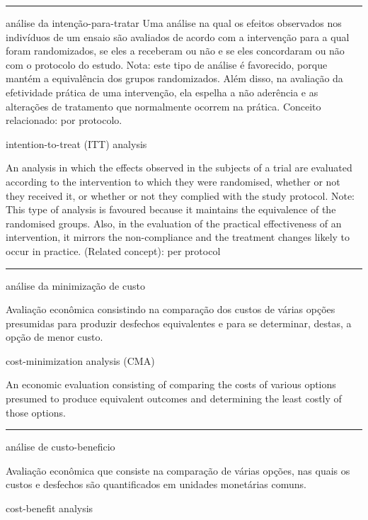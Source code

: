 \documentclass[
  openany]{book}
\begin{document}
\begin{center}\rule{0.5\linewidth}{0.5pt}\end{center}

análise da intenção-para-tratar
Uma análise na qual os efeitos observados nos indivíduos de um ensaio são avaliados de acordo com a intervenção para a qual foram randomizados, se eles a receberam ou não e se eles concordaram ou não com o protocolo do estudo. Nota: este tipo de análise é favorecido, porque mantém a equivalência dos grupos randomizados. Além disso, na avaliação da efetividade prática de uma intervenção, ela espelha a não aderência e as alterações de tratamento que normalmente ocorrem na prática. Conceito relacionado: por protocolo.

intention-to-treat (ITT) analysis

An analysis in which the effects observed in the subjects of a trial are evaluated according to the intervention to which they were randomised, whether or not they received it, or whether or not they complied with the study protocol. Note: This type of analysis is favoured because it maintains the equivalence of the randomised groups. Also, in the evaluation of the practical effectiveness of an intervention, it mirrors the non-compliance and the treatment changes likely to occur in practice. (Related concept): per protocol

\begin{center}\rule{0.5\linewidth}{0.5pt}\end{center}

análise da minimização de custo

Avaliação econômica consistindo na comparação dos custos de várias opções presumidas para produzir desfechos equivalentes e para se determinar, destas, a opção de menor custo.

cost-minimization analysis (CMA)

An economic evaluation consisting of comparing the costs of various options presumed to produce equivalent outcomes and determining the least costly of those options.

\begin{center}\rule{0.5\linewidth}{0.5pt}\end{center}

análise de custo-beneficio

Avaliação econômica que consiste na comparação de várias opções, nas quais os custos e desfechos são quantificados em unidades monetárias comuns.

cost-benefit analysis
\end{document}
